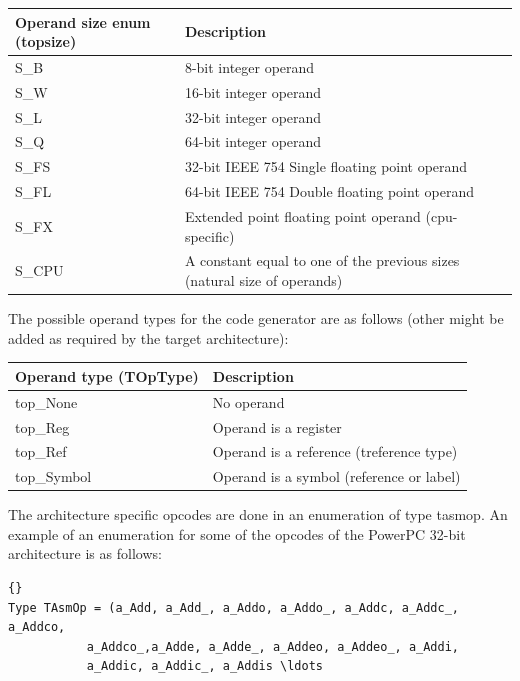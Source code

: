 \documentclass [a4paper,12pt]{article}
\begin{document}
\begin{longtable}{|l|p{10cm}|}
\hline
Operand size enum (\textsf{topsize}) & Description \\
\hline
\endhead
\hline
\endfoot
\textsf{S{\_}B}&            8-bit integer operand \\
\textsf{S{\_}W}&            16-bit integer operand \\
\textsf{S{\_}L}&            32-bit integer operand \\
\textsf{S{\_}Q}&            64-bit integer operand \\
\textsf{S{\_}FS}&           32-bit IEEE 754 Single floating point operand \\
\textsf{S{\_}FL}&           64-bit IEEE 754 Double floating point operand \\
\textsf{S{\_}FX}&           Extended point floating point operand (cpu-specific) \\
\textsf{S{\_}CPU}&          A constant equal to one of the previous sizes (natural size of operands) \\
\end{longtable}

The possible operand types for the code generator are as follows (other
might be added as required by the target architecture):

\begin{longtable}{|l|p{10cm}|}
\hline
Operand type (\textsf{TOpType}) & Description \\
\hline
\endhead
\hline
\endfoot
\textsf{top{\_}None}&           No operand \\
\textsf{top{\_}Reg}&            Operand is a register \\
\textsf{top{\_}Ref}&            Operand is a reference (\textsf{treference} type) \\
\textsf{top{\_}Symbol}&         Operand is a symbol (reference or label) \\
\end{longtable}

The architecture specific opcodes are done in an enumeration of type
\textsf{tasmop}. An example of an enumeration for some of the opcodes of the
PowerPC 32-bit architecture is as follows:

\begin{lstlisting}{}
Type TAsmOp = (a_Add, a_Add_, a_Addo, a_Addo_, a_Addc, a_Addc_, a_Addco,
           a_Addco_,a_Adde, a_Adde_, a_Addeo, a_Addeo_, a_Addi,
           a_Addic, a_Addic_, a_Addis \ldots
\end{lstlisting}
\end{document}
